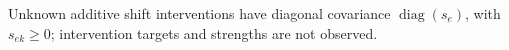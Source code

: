 Unknown additive shift interventions have diagonal covariance \(\operatorname{diag}(s_e)\), with \(s_{ek}\geq0\); intervention targets and strengths are not observed.